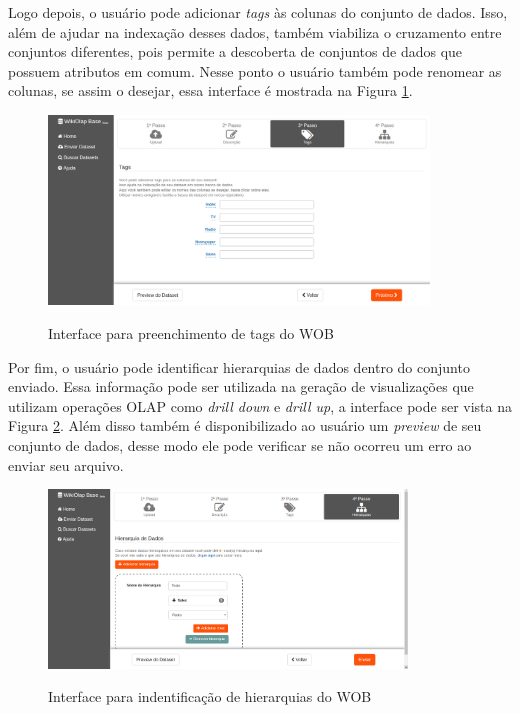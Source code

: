 Logo depois, o usuário pode adicionar \textit{tags} às colunas do conjunto de dados. Isso, 
além de ajudar na indexação desses dados, também viabiliza o cruzamento entre conjuntos 
diferentes, pois permite a descoberta de conjuntos de dados que possuem atributos em comum. 
Nesse ponto o usuário também pode renomear as colunas, se assim o desejar, essa interface é 
mostrada na Figura \ref{fig:wob-tags}. 

\begin{figure}[!htb]
    \centering
    \caption{Interface para preenchimento de tags do WOB}
    \includegraphics[width=0.9\textwidth]{./04-figuras/wob-tags}
    \label{fig:wob-tags}
\end{figure}

Por fim, o usuário pode identificar hierarquias de dados dentro do conjunto enviado. Essa 
informação pode ser utilizada na geração de visualizações que utilizam operações OLAP como 
\textit{drill down} e \textit{drill up}, a interface pode ser vista na Figura \ref{fig:wob-hierarquia}. 
Além disso também é disponibilizado ao usuário um \textit{preview} de seu conjunto de dados, 
desse modo ele pode verificar se não ocorreu um erro ao enviar seu arquivo.

\begin{figure}[!htb]
    \centering
    \caption{Interface para indentificação de hierarquias do WOB}
    \includegraphics[width=0.85\textwidth]{./04-figuras/wob-hierarquia}
    \label{fig:wob-hierarquia}
\end{figure}

